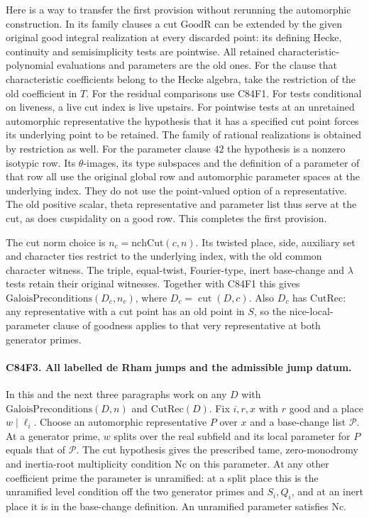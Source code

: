 Here is a way to transfer the first provision without rerunning
the automorphic construction. In its family clauses a cut
$\mathrm{GoodR}$ can be extended by the given original good
integral realization at every discarded point: its defining
Hecke, continuity and semisimplicity tests are pointwise. All
retained characteristic-polynomial evaluations and parameters
are the old ones. For the clause that characteristic coefficients
belong to the Hecke algebra, take the restriction of the old
coefficient in $T$. For the residual comparisons use C84F1.
For tests conditional on liveness, a live cut index is live
upstairs. For pointwise tests at an unretained automorphic
representative the hypothesis that it has a specified cut point
forces its underlying point to be retained. The family of
rational realizations is obtained by restriction as well.
For the parameter clause $42$ the hypothesis is a nonzero
isotypic row. Its $\theta$-images, its type subspaces and the
definition of a parameter of that row all use the original
global row and automorphic parameter spaces at the underlying
index. They do not use the point-valued option of a
representative. The old positive scalar, theta representative
and parameter list thus serve at the cut, as does cuspidality
on a good row. This completes the first provision.

The cut norm choice is $n_c=\mathrm{nchCut}(c,n)$. Its twisted
place, side, auxiliary set and character ties restrict to the
underlying index, with the old common character witness. The
triple, equal-twist, Fourier-type, inert base-change and
$\lambda$ tests retain their original witnesses. Together with
C84F1 this gives $\mathrm{GaloisPreconditions}(D_c,n_c)$,
where $D_c=\operatorname{cut}(D,c)$. Also $D_c$ has
$\mathrm{CutRec}$: any representative with a cut point has an
old point in $S$, so the nice-local-parameter clause of goodness
applies to that very representative at both generator primes.

\paragraph{C84F3. All labelled de Rham jumps and the admissible jump datum.}
In this and the next three paragraphs work on any $D$ with
$\mathrm{GaloisPreconditions}(D,n)$ and $\mathrm{CutRec}(D)$.
Fix $i,r,x$ with $r$ good and a place $w\mid\ell_i$. Choose an
automorphic representative $P$ over $x$ and a base-change list
$\mathcal P$. At a generator prime, $w$ splits over the real
subfield and its local parameter for $P$ equals that of
$\mathcal P$. The cut hypothesis gives the prescribed tame,
zero-monodromy and inertia-root multiplicity condition $\mathrm{Nc}$ on
this parameter. At any other coefficient prime the parameter
is unramified: at a split place this is the unramified level
condition off the two generator primes and $S_i,Q_i$, and at
an inert place it is in the base-change definition. An
unramified parameter satisfies $\mathrm{Nc}$.

